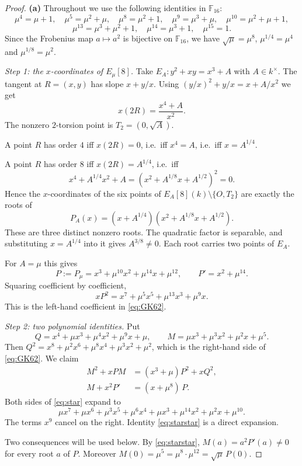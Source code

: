 \documentclass[11pt]{article}
\theoremstyle{remark}
\newcommand{\F}{\mathbb F}
\begin{document}
\begin{proof}
\textbf{(a)}  Throughout we use the following identities in $\F_{16}$:
\[
 \mu^4=\mu+1,\quad \mu^5=\mu^2+\mu,\quad \mu^8=\mu^2+1,\quad
 \mu^9=\mu^3+\mu,\quad \mu^{10}=\mu^2+\mu+1,
\]
\[
 \mu^{13}=\mu^3+\mu^2+1,\quad \mu^{14}=\mu^3+1,\quad \mu^{15}=1 .
\]
Since the Frobenius map $a\mapsto a^2$ is bijective on $\F_{16}$, we
have $\sqrt{\mu}=\mu^8$, $\mu^{1/4}=\mu^4$ and $\mu^{1/8}=\mu^2$.

\smallskip
\emph{Step 1: the $x$-coordinates of $E_\mu[8]$.}
Take $E_A:y^2+xy=x^3+A$ with $A\in k^\times$. The tangent at $R=(x,y)$
has slope $x+y/x$. Using $(y/x)^2+y/x=x+A/x^2$ we get
\[
 x(2R)=\frac{x^4+A}{x^2}.
\]
The nonzero $2$-torsion point is $T_2=(0,\sqrt A)$.

A point $R$ has order $4$ iff $x(2R)=0$, i.e.\ iff $x^4=A$, i.e.\ iff
$x=A^{1/4}$.

A point $R$ has order $8$ iff $x(2R)=A^{1/4}$, i.e.\ iff
\[
 x^4+A^{1/4}x^2+A=(x^2+A^{1/8}x+A^{1/2})^2=0 .
\]
Hence the $x$-coordinates of the six points of
$E_A[8](k)\setminus\{O,T_2\}$ are exactly the roots of
\[
 P_A(x)=(x+A^{1/4})(x^2+A^{1/8}x+A^{1/2}).
\]
These are three distinct nonzero roots. The quadratic factor is
separable, and substituting $x=A^{1/4}$ into it gives $A^{3/8}\neq0$.
Each root carries two points of $E_A$.

For $A=\mu$ this gives
\[
 P:=P_\mu=x^3+\mu^{10}x^2+\mu^{14}x+\mu^{12},
 \qquad
 P'=x^2+\mu^{14}.
\]
Squaring coefficient by coefficient,
\[
 xP^2=x^7+\mu^5x^5+\mu^{13}x^3+\mu^9x .
\]
This is the left-hand coefficient in \eqref{eq:GK62}.

\smallskip
\emph{Step 2: two polynomial identities.}  Put
\[
 Q=x^4+\mu x^3+\mu^4x^2+\mu^9x+\mu,
 \qquad
 M=\mu x^3+\mu^3x^2+\mu^2x+\mu^5 .
\]
Then $Q^2=x^8+\mu^2x^6+\mu^8x^4+\mu^3x^2+\mu^2$, which is the
right-hand side of \eqref{eq:GK62}. We claim
\begin{align}
 M^2+xPM&=(x^3+\mu)P^2+xQ^2, \label{eq:star}\\
 M+x^2P'&=(x+\mu^8)\,P. \label{eq:starstar}
\end{align}
Both sides of \eqref{eq:star} expand to
\[
 \mu x^7+\mu x^6+\mu^3x^5+\mu^6x^4+\mu x^3+\mu^{14}x^2+\mu^2x+\mu^{10}.
\]
The terms $x^9$ cancel on the right. Identity \eqref{eq:starstar} is a
direct expansion.

Two consequences will be used below. By \eqref{eq:starstar},
$M(a)=a^2P'(a)\neq0$ for every root $a$ of $P$. Moreover
$M(0)=\mu^5=\mu^8\cdot\mu^{12}=\sqrt\mu\,P(0)$.


\end{proof}
\end{document}
